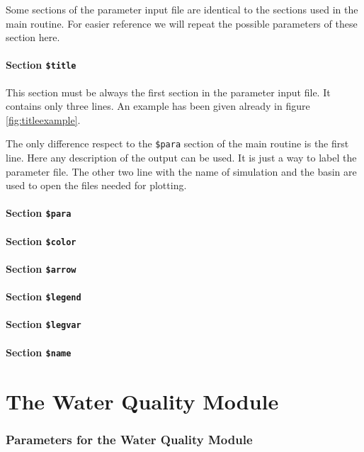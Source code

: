\documentclass{report}
\begin{document}
Some sections of the parameter input file are identical to the 
sections used in the main routine. For easier reference we will
repeat the possible parameters of these section here.


\subsubsection{Section {\tt \$title}}

This section must be always the first section in the parameter input file.
It contains only three lines. An example has been given already in 
figure \ref{fig:titleexample}.

The only difference respect to the {\tt \$para} section of the main routine
is the first line. Here any description of the output can be used.
It is just a way to label the parameter file.
The other two line with the name of simulation and the basin are used
to open the files needed for plotting.


\subsubsection{Section {\tt \$para}}




\subsubsection{Section {\tt \$color}}




\subsubsection{Section {\tt \$arrow}}




\subsubsection{Section {\tt \$legend}}




\subsubsection{Section {\tt \$legvar}}




\subsubsection{Section {\tt \$name}}




\chapter{The Water Quality Module}



\subsection{Parameters for the Water Quality Module}








\end{document}

